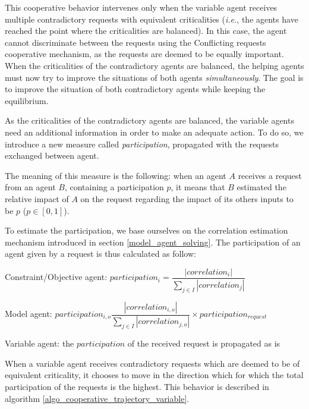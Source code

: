 This cooperative behavior intervenes only when the variable agent receives multiple contradictory requests with equivalent criticalities (\emph{i.e.}, the agents have reached the point where the criticalities are balanced). In this case, the agent cannot discriminate between the requests using the Conflicting requests cooperative mechanism, as the requests are deemed to be equally important. When the criticalities of the contradictory agents are balanced, the helping agents must now try to improve the situations of both agents \emph{simultaneously}. The goal is to improve the situation of both contradictory agents while keeping the equilibrium.

As the criticalities of the contradictory agents are balanced, the variable agents need an additional information in order to make an adequate action. To do so, we introduce a new measure called \emph{participation}, propagated with the requests exchanged between agent.

The meaning of this measure is the following: when an agent $A$ receives a request from an agent $B$, containing a participation $p$, it means that $B$ estimated the relative impact of $A$ on the request regarding the impact of its others inputs to be $p$ ($p \in [0,1]$).

To estimate the participation, we base ourselves on the correlation estimation mechanism introduced in section \ref{model_agent_solving}. The participation of an agent given by a request is thus calculated as follow:
\begin{compactitem}
\item Constraint/Objective agent: $participation_{i} = \dfrac{| correlation_{i} |}{\displaystyle \sum_{j \in I}{|correlation _{j}|}}$
\item Model agent: $participation_{i,o}\dfrac{| correlation_{i,o} |}{\displaystyle \sum_{j \in I}{|correlation _{j,o}|}} \times participation_{request}$
\item Variable agent: the $participation$ of the received request is propagated as is
\end{compactitem}

When a variable agent receives contradictory requests which are deemed to be of equivalent criticality, it chooses to move in the direction which for which the total participation of the requests is the highest. This behavior is described in algorithm \ref{algo_cooperative_trajectory_variable}.

